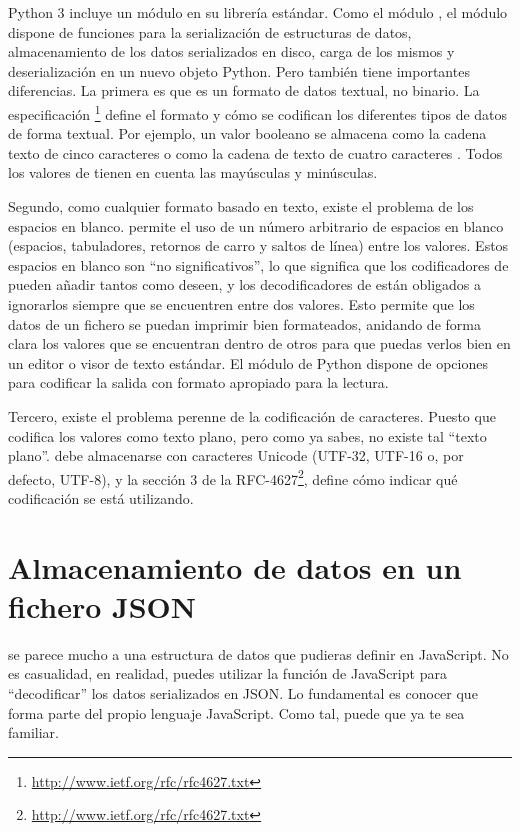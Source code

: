 Python 3 incluye un módulo  en su librería estándar. Como el módulo , el módulo  dispone de funciones para la serialización de estructuras de datos, almacenamiento de los datos serializados en disco, carga de los mismos y deserialización en un nuevo objeto Python. Pero también tiene importantes diferencias. La primera es que  es un formato de datos textual, no binario. La especificación \footnote{\href{http://www.ietf.org/rfc/rfc4627.txt}{http://www.ietf.org/rfc/rfc4627.txt}} define el formato y cómo se codifican los diferentes tipos de datos de forma textual. Por ejemplo, un valor booleano se almacena como la cadena texto de cinco caracteres  o como la cadena de texto de cuatro caracteres . Todos los valores de  tienen en cuenta las mayúsculas y minúsculas.

Segundo, como cualquier formato basado en texto, existe el problema de los espacios en blanco.  permite el uso de un número arbitrario de espacios en blanco (espacios, tabuladores, retornos de carro y saltos de línea) entre los valores. Estos espacios en blanco son ``no significativos'', lo que significa que los codificadores de  pueden añadir tantos como deseen, y los decodificadores de  están obligados a ignorarlos siempre que se encuentren entre dos valores. Esto permite que los datos de un fichero  se puedan imprimir bien formateados, anidando de forma clara los valores que se encuentran dentro de otros para que puedas verlos bien en un editor o visor de texto estándar. El módulo  de Python dispone de opciones para codificar la salida con formato apropiado para la lectura.

Tercero, existe el problema perenne de la codificación de caracteres. Puesto que  codifica los valores como texto plano, pero como ya sabes, no existe tal ``texto plano''.  debe almacenarse con caracteres Unicode (UTF-32, UTF-16 o, por defecto, UTF-8), y la sección 3 de la RFC-4627\footnote{\href{http://www.ietf.org/rfc/rfc4627.txt}{http://www.ietf.org/rfc/rfc4627.txt}}, define cómo indicar qué codificación se está utilizando. 

\section{Almacenamiento de datos en un fichero JSON}

 se parece mucho a una estructura de datos que pudieras definir en Java\-Script. No es casualidad, en realidad, puedes utilizar la función  de JavaScript para ``decodificar'' los datos serializados en JSON. Lo fundamental es conocer que  forma parte del propio lenguaje JavaScript. Como tal,  puede que ya te sea familiar.


